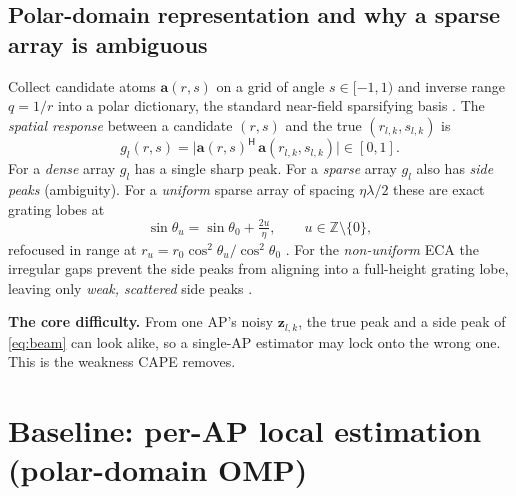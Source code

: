 \documentclass[11pt]{article}
\newcommand{\herm}{^{\mathsf{H}}}
\newcommand{\vz}{\mathbf{z}}
\newcommand{\va}{\mathbf{a}}
\begin{document}
\subsection{Polar-domain representation and why a sparse array is ambiguous}
Collect candidate atoms $\va(r,s)$ on a grid of angle $s\in[-1,1)$ and inverse range $q=1/r$ into a
polar dictionary, the standard near-field sparsifying basis \cite{cui2022channel,chen2024nearfield}.
The \emph{spatial response} between a candidate $(r,s)$ and the true $(r_{l,k},s_{l,k})$ is
\begin{equation}
g_{l}(r,s)=\big|\va(r,s)\herm\,\va(r_{l,k},s_{l,k})\big|\in[0,1].
\label{eq:beam}
\end{equation}
For a \emph{dense} array $g_l$ has a single sharp peak. For a \emph{sparse} array $g_l$ also has
\emph{side peaks} (ambiguity). For a \emph{uniform} sparse array of spacing $\eta\lambda/2$ these are
exact grating lobes at
\begin{equation}
\sin\theta_u=\sin\theta_0+\tfrac{2u}{\eta},\qquad u\in\mathbb Z\setminus\{0\},
\label{eq:grating}
\end{equation}
refocused in range at $r_u=r_0\cos^2\theta_u/\cos^2\theta_0$ \cite[Lemmas~5--6]{zhou2025sparse}. For
the \emph{non-uniform} ECA the irregular gaps prevent the side peaks from aligning into a full-height
grating lobe, leaving only \emph{weak, scattered} side peaks \cite[Sec.~III]{zhou2025sparse}.

\begin{keybox}
\textbf{The core difficulty.} From one AP's noisy $\vz_{l,k}$, the true peak and a side peak of
\eqref{eq:beam} can look alike, so a single-AP estimator may lock onto the wrong one. This is the
weakness CAPE removes.
\end{keybox}

\section{Baseline: per-AP local estimation (polar-domain OMP)}
\end{document}
